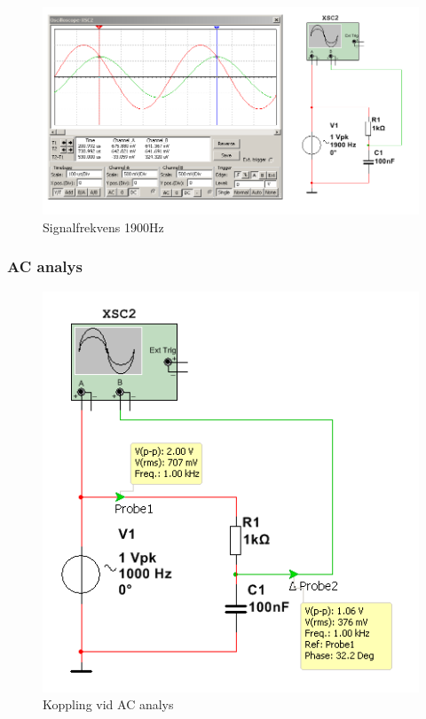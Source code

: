 \documentclass[11pt,a4paper]{article}
\begin{document}
\begin{figure}[H]
    \centering
    \includegraphics[scale=0.5]{ee466multisim/5-1900Hz.png}
    \caption{Signalfrekvens 1900Hz}
    \label{fig:sim-5-1900Hz}
\end{figure}


\subsubsection{AC analys}
\begin{figure}[htbp]
    \centering
    \includegraphics[scale=0.5]{ee466multisim/5-ACprobes.png}
    \caption{Koppling vid AC analys}
    \label{fig:sim-5-ACanalysis-setup}
\end{figure}
\end{document}
